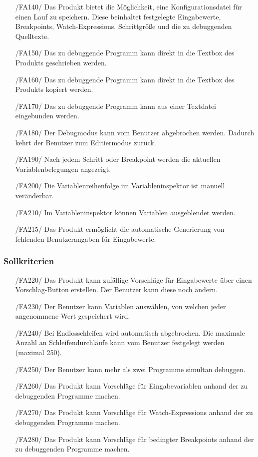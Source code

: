 \documentclass[parskip=full]{scrartcl}
\begin{document}
\begin{itemize}
		\item[/FA140/] Das Produkt bietet die Möglichkeit, eine \gls{Konfigurationsdatei} für einen Lauf zu speichern. Diese beinhaltet festgelegte Eingabewerte, Breakpoints, Watch-Expressions, Schrittgröße und die zu debuggenden Quelltexte.
		\item[/FA150/] Das zu debuggende Programm kann direkt in die Textbox des Produkts  geschrieben werden.
		\item[/FA160/] Das zu debuggende Programm kann direkt in die Textbox des Produkts kopiert werden.
		\item[/FA170/] Das zu debuggende Programm kann aus einer Textdatei eingebunden werden.
		\item[/FA180/] Der \gls{Debugmodus} kann vom Benutzer abgebrochen werden. Dadurch kehrt der Benutzer zum \gls{Editiermodus} zurück.
		\item[/FA190/] Nach jedem Schritt oder \gls{Breakpoint} werden die aktuellen Variablenbelegungen angezeigt.
		\item[/FA200/] Die Variablenreihenfolge im Variableninspektor ist manuell veränderbar.
		\item[/FA210/] Im Variableninspektor können Variablen ausgeblendet werden.
		\item[/FA215/] Das Produkt ermöglicht die automatische Generierung von fehlenden Benutzerangaben für Eingabewerte.
		\end{itemize}

 		\subsubsection{Sollkriterien}
		\begin{itemize}
		\item[/FA220/] Das Produkt kann zufällige Vorschläge für Eingabewerte über einen Vorschlag-Button erstellen. Der Benutzer kann diese noch ändern.
		\item[/FA230/] Der Benutzer kann Variablen auswählen, von welchen jeder angenommene Wert gespeichert wird.
		\item[/FA240/] Bei Endlosschleifen wird automatisch abgebrochen. Die maximale Anzahl an Schleifendurchläufe kann vom Benutzer festgelegt werden (maximal 250).
		\item[/FA250/] Der Benutzer kann mehr als zwei Programme simultan debuggen.
		\item[/FA260/] Das Produkt kann Vorschläge für Eingabevariablen anhand der zu debuggenden Programme machen.
		\item[/FA270/] Das Produkt kann Vorschläge für \glspl{Watch-Expression} anhand der zu debuggenden Programme machen.
		\item[/FA280/] Das Produkt kann Vorschläge für \glspl{bedingter Breakpoint} anhand der zu debuggenden Programme machen.
		\end{itemize}
\end{document}
